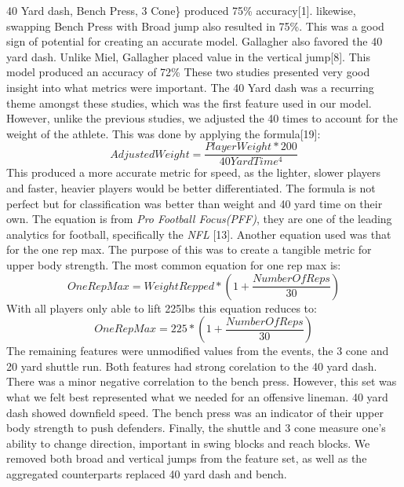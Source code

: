 \documentclass[confrence]{IEEEtran}
\begin{document}
40 Yard dash, Bench Press, 3 Cone\} produced 75\% accuracy[1]. likewise, swapping Bench Press with Broad jump also resulted in 75\%.
This was a good sign of potential for creating an accurate model.
Gallagher also favored the 40 yard dash. Unlike Miel, Gallagher placed value in the vertical jump[8]. This model produced an accuracy of 72\%
These two studies presented very good insight into what metrics were important.
The 40 Yard dash was a recurring theme amongst these studies, which was the first feature used in our model.
However, unlike the previous studies, we adjusted the 40 times to account for the weight of the athlete. This was done by applying the formula[19]:
\[
    AdjustedWeight = \frac{PlayerWeight*200}{40YardTime^4}
\]
This produced a more accurate metric for speed, as the lighter, slower players and faster, heavier players would be better differentiated.
The formula is not perfect but for classification was better than weight and 40 yard time on their own.
The equation is from \textit{Pro Football Focus(PFF)}, they are one of the leading analytics for football, specifically the \textit{NFL} [13].
Another equation used was that for the one rep max. The purpose of this was to create a tangible metric for upper body strength.
The most common equation for one rep max is:
\[
    OneRepMax = WeightRepped*(1+\frac{NumberOfReps}{30})
\]
With all players only able to lift 225lbs this equation reduces to:
\[
    OneRepMax = 225*(1+\frac{NumberOfReps}{30})
\]
The remaining features were unmodified values from the events, the 3 cone and 20 yard shuttle run.
Both features had strong corelation to the 40 yard dash. There was a minor negative correlation to the bench press.
However, this set was what we felt best represented what we needed for an offensive lineman.
40 yard dash showed downfield speed. The bench press was an indicator of their upper body strength to push defenders. Finally, the shuttle and 3 cone measure one's ability to change direction, important in swing blocks and reach blocks.
We removed both broad and vertical jumps from the feature set, as well as the aggregated counterparts replaced 40 yard dash and bench.
\end{document}
